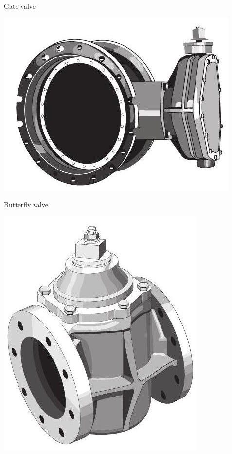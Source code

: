 \documentclass[10pt]{article}
\begin{document}
Gate valve

\includegraphics[max width=\textwidth]{ButterflyValve}

Butterfly valve

\includegraphics[max width=\textwidth]{PlugValve}
\end{document}
